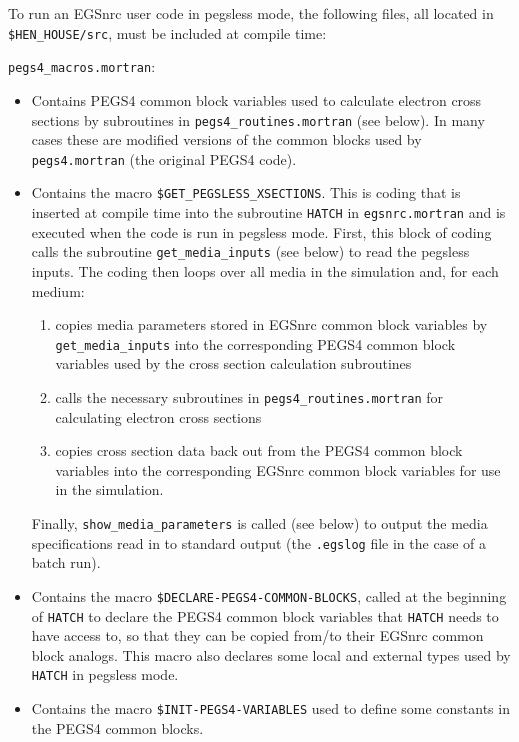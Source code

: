 To run an EGSnrc user code in pegsless mode, the following files, all located in
{\tt \$HEN\_HOUSE/src}, must be included at compile time:

\begin{description}
\item {\tt pegs4\_macros.mortran}:
\begin{itemize}
\item Contains PEGS4 common block variables used to calculate electron cross sections by subroutines in {\tt pegs4\_routines.mortran}
(see below).  In many cases these are modified versions of the common blocks used by {\tt pegs4.mortran} (the
original PEGS4 code).
\item Contains the macro {\tt \$GET\_PEGSLESS\_XSECTIONS}.  This is coding that is inserted at compile time into
the subroutine {\tt HATCH} in {\tt egsnrc.mortran} and is executed when the code is run in pegsless mode.  First, this
block of coding calls the subroutine {\tt get\_media\_inputs} (see below) to read the pegsless inputs.  The coding then
loops over all media in the simulation and, for each medium:
\begin{enumerate}
\item copies media parameters stored in EGSnrc common block variables by\\
 {\tt get\_media\_inputs} into the corresponding
PEGS4 common block variables used by the cross section calculation subroutines
\item calls the
necessary subroutines in {\tt pegs4\_routines.mortran} for calculating electron cross sections
\item copies cross section data back out from the PEGS4 common block variables into the corresponding EGSnrc common
block variables for use in the simulation.
\end{enumerate}
Finally, {\tt show\_media\_parameters} is called (see below) to output the media specifications read in to standard
output (the {\tt .egslog} file in the case of a batch run).
\item Contains the macro {\tt \$DECLARE-PEGS4-COMMON-BLOCKS}, called at the beginning of {\tt HATCH} to declare the
PEGS4 common block variables that {\tt HATCH} needs to have access to, so that they can be copied from/to their
EGSnrc common block analogs.  This macro also declares some local and external types used by {\tt HATCH} in
pegsless mode.
\item Contains the macro {\tt \$INIT-PEGS4-VARIABLES} used to define some constants in the PEGS4 common blocks.

\end{itemize}
\end{description}

